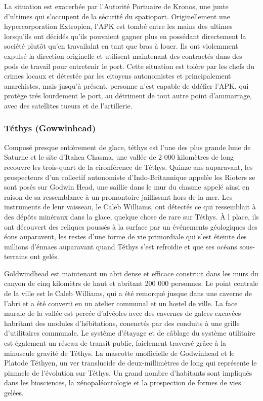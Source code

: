 La situation est exacerbée par l'Autorité Portuaire de Kronos, une junte d'ultimes qui s'occupent de la sécurité du spatioport. Originellement une hypercorporation Extropien, l'APK est tombé entre les mains des ultimes lorsqu'ils ont décidés qu'ils pouvaient gagner plus en possédant directement la société plutôt qu'en travailalnt en tant que bras à louer. Ils ont violemment expulsé la direction originelle et utilisent maintenant des contractés dans des pods de travail pour entretenir le port. Cette situation est tolére par les chefs du crimes locaux et détestée par les citoyens autonomistes et principalement anarchistes, mais jusqu'à présent, personne n'est capable de ddéfier l'APK, qui protège trés lourdement le port, au détriment de tout autre point d'ammarrage, avec des satellites tueurs et de l'artillerie. 

\subsubsection{Téthys (Gowwinhead)} \label{sec:tethys-gowwinhead} 

Composé presque entièrement de glace, téthys est l'une des plus grande lune de Saturne et le site d'Itahca Chasma, une vallée de 2 000 kilomètres de long recouvre les trois-quart de la cironférence de Téthys. Quinze ans auparavant, les prospecteurs d'un collectif autonomiste d'Indo-Britannique appelée les Rioters se sont posés sur Godwin Head, une saillie dans le mur du chasme appelé ainsi en raison de sa ressemblance à un promontoire jaillissant hors de la mer. Les instruments de leur vaisseau, le Caleb Williams, ont détectés ce qui ressemblait à des dépôts minéraux dans la glace, quelque chose de rare sur Téthys. À l place, ils ont découvert des reliques poussés à la surface par un événements géologiques des éons auparavent, les restes d'une forme de vie primordiale qui s'est éteinte des millions d'énnaes auparavant quand Téthys s'est refroidie et que ses océans sous-terrains ont gelés. 

Goldwindhead est maintenant un abri dense et efficace construit dans les murs du canyon de cinq kilomètrs de haut et abritant 200 000 personnes. Le point centrale de la ville est le Caleb Williams, qui a été remorqué jusque dans une caverne de l'abri et a été converti en un atelier communal et un hœtel de ville. La face murale de la vallée est percée d'alvéoles avec des cavernes de galces excavées habritant des modules d'hébitations, conenctés par des conduits à une grille d'utilitaires communale. Le système d'étayage et de câblage du système utilitaire est également un réseau de transit public, faiclement traversé grâce à la minuscule gravité de Téthys. La mascotte unofficielle de Godwinhead et le Platode Téthyen, un ver translucide de deux-millimètres de long qui représente le pinnacle de l'évolution sur Téthys. Un grand nombre d'habitants sont impliqués dans les biosciences, la xénopaléontologie et la prospection de formes de vies gelées. 

